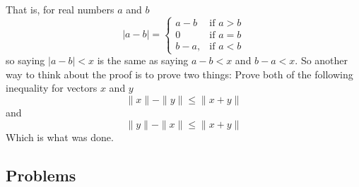 \begin{example}[]
\begin{proof-dan}
    That is, for real numbers $a$ and $b$
    \begin{equation*}
      |a-b|=
      \begin{cases}
        a-b & \text{if }a>b \\
        0 & \text{if }a=b \\
        b-a, & \text{if }a<b
      \end{cases}
    \end{equation*}
    so saying $|a-b|<x$ is the same as saying $a-b<x$ and $b-a<x$.
    So another way to think about the proof is to prove two things:
    Prove both of the following inequality for vectors $x$ and $y$
    \begin{equation*}
      \|x\|-\|y\|\leq\|x+y\|
    \end{equation*}
    and
    \begin{equation*}
      \|y\|-\|x\|\leq\|x+y\|
    \end{equation*}
    Which is what was done.
  \end{proof-dan}
\end{example}

\subsection{Problems}

